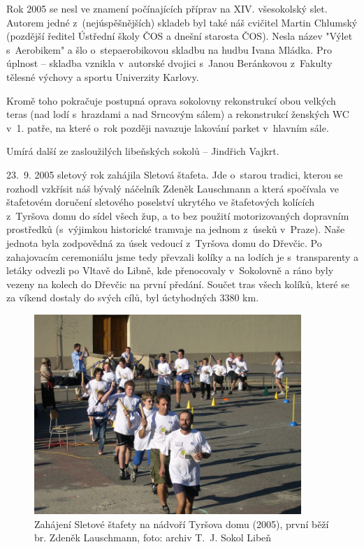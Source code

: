 \documentclass[a5paper, 11pt, twoside]{article}
\begin{document}
Rok 2005 se nesl ve znamení počínajících příprav na XIV. všesokolský
slet. Autorem jedné z~(nejúspěšnějších) skladeb byl také náš cvičitel
Martin Chlumský (pozdější ředitel Ústřední školy ČOS a dnešní starosta
ČOS). Nesla název "Výlet s~Aerobikem" a šlo o~stepaerobikovou skladbu
na hudbu Ivana Mládka. Pro úplnost -- skladba vznikla v~autorské dvojici
s~Janou Beránkovou z~Fakulty tělesné výchovy a sportu Univerzity
Karlovy.

Kromě toho pokračuje postupná oprava sokolovny rekonstrukcí obou velkých
teras (nad lodí s~hrazdami a nad Srncovým sálem) a rekonstrukcí ženských
WC v~1. patře, na které o~rok později navazuje lakování parket v~hlavním
sále.

Umírá další ze zasloužilých libeňských sokolů -- Jindřich Vajkrt.

23.~9. 2005 sletový rok zahájila Sletová štafeta. Jde o~starou tradici,
kterou se rozhodl vzkřísit náš bývalý náčelník Zdeněk Lauschmann a která
spočívala ve štafetovém doručení sletového poselství ukrytého ve
štafetových kolících z~Tyršova domu do sídel všech žup, a to bez použití
motorizovaných dopravním prostředků (s~výjimkou historické tramvaje na
jednom z~úseků v~Praze). Naše jednota byla zodpovědná za úsek vedoucí
z~Tyršova domu do Dřevčic. Po zahajovacím ceremoniálu jsme tedy převzali
kolíky a na lodích je s~transparenty a letáky odvezli po Vltavě do
Libně, kde přenocovaly v~Sokolovně a ráno byly vezeny na kolech do
Dřevčic na první předání. Součet tras všech kolíků, které se za víkend
dostaly do svých cílů, byl úctyhodných 3380 km.

\begin{figure}[h!]
  \centering 
  \includegraphics[width=0.9\textwidth]{img/51_stafeta.jpg}
  \caption*{Zahájení Sletové štafety na nádvoří Tyršova domu (2005), první
  běží br. Zdeněk Lauschmann, foto: archiv T.~J. Sokol Libeň}
\end{figure}
\end{document}
